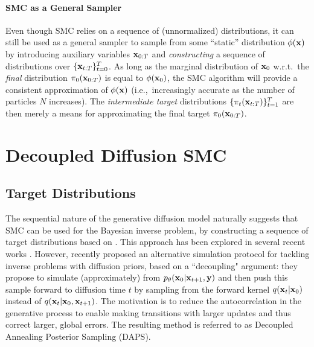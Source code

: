 \documentclass{proc}
\begin{document}
\paragraph{SMC as a General Sampler}
Even though SMC relies on a sequence of (unnormalized) distributions, it can still be used as a general sampler to sample from some ``static'' distribution $\phi(\mathbf{x})$ by introducing auxiliary variables $\mathbf{x}_{0:T}$ and \emph{constructing} a sequence of distributions over $\{ \mathbf{x}_{t:T} \}_{t=0}^T$. As long as the marginal distribution of $\mathbf{x}_0$ w.r.t.\ the \emph{final} distribution $\pi_0(\mathbf{x}_{0:T})$ is equal to $\phi(\mathbf{x}_0)$, the SMC algorithm will provide a consistent approximation of $\phi(\mathbf{x})$ (i.e.,\ increasingly accurate as the number of particles $N$ increases). The \emph{intermediate target} distributions $\{\pi_t(\mathbf{x}_{t:T})\}_{t=1}^T$ are then merely a means for approximating the final target
$\pi_0(\mathbf{x}_{0:T})$.

\section{Decoupled Diffusion SMC}
\label{sec:ddsmc}
\subsection{Target Distributions}
\label{sec:ddsmc_prior}
The sequential nature of the generative diffusion model naturally suggests that SMC can be used for the Bayesian inverse problem, by constructing a sequence of target distributions based on . This approach has been explored in several recent works \citep[see also ]{wu_practical_2023, cardoso_monte_2023-2}. However, \citet{zhang_improving_2024} recently proposed an alternative simulation protocol for tackling inverse problems with diffusion priors, based on a ``decoupling" argument: they propose to simulate (approximately) from $p_\theta(\mathbf{x}_0|\mathbf{x}_{t+1}, \mathbf{y})$ and then push this sample forward to diffusion time $t$ by sampling from the forward kernel $q(\mathbf{x}_{t}|\mathbf{x}_0)$ instead of $q(\mathbf{x}_{t}|\mathbf{x}_0, \mathbf{x}_{t+1})$. The motivation is to reduce the autocorrelation in the generative process to enable making transitions with larger updates and thus correct larger, global errors. The resulting method is referred to as Decoupled Annealing Posterior Sampling (DAPS).
\end{document}

